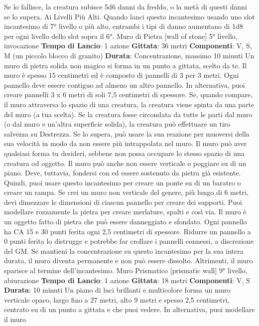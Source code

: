 \begin{multicols}{2}
Se lo fallisce, la creatura subisce 5d6 danni da freddo,
o la metà di questi danni se lo supera.
Ai Livelli Più Alti. Quando lanci questo incantesimo
usando uno slot incantesimo di 7° livello o più alto,
entrambi i tipi di danno aumentano di 1d8 per ogni
livello dello slot sopra il 6°.
Muro di Pietra
[wall of stone]
5° livello, invocazione
\textbf{Tempo di Lancio}: 1 azione
\textbf{Gittata}: 36 metri
\textbf{Componenti}: V, S, M (un piccolo blocco di granito)
\textbf{Durata}: Concentrazione, massimo 10 minuti
Un muro di pietra solida non magico si forma in un
punto a gittata, scelto da te. Il muro è spesso 15
centimetri ed è composto di pannelli di 3 per 3 metri.
Ogni pannello deve essere contiguo ad almeno un altro
pannello. In alternativa, puoi creare pannelli 3 x 6 metri
di soli 7,5 centimetri di spessore.
Se, quando compare, il muro attraversa lo spazio di una
creatura, la creatura viene spinta da una parte del muro
(a tua scelta). Se la creatura fosse circondata da tutte le
parti dal muro (o dal muro e un’altra superficie solida),
la creatura può effettuare un tiro salvezza su Destrezza.
Se lo supera, può usare la sua reazione per muoversi
della sua velocità in modo da non essere più
intrappolata nel muro.
Il muro può aver qualsiasi forma tu desideri, sebbene
non possa occupare lo stesso spazio di una creatura od
oggetto. Il muro può anche non essere verticale o
poggiare su di un piano. Deve, tuttavia, fondersi con ed
essere sostenuto da pietra già esistente. Quindi, puoi
usare questo incantesimo per creare un ponte su di un
baratro o creare un rampa.
Se crei un muro non verticale del genere, più lungo di 6
metri, devi dimezzare le dimensioni di ciascun pannello
per creare dei supporti. Puoi modellare rozzamente la
pietra per creare merlature, spalti e così via.
Il muro è un oggetto fatto di pietra che può essere
danneggiato e sfondato. Ogni pannello ha CA 15 e 30
punti ferita ogni 2,5 centimetri di spessore. Ridurre un
pannello a 0 punti ferita lo distrugge e potrebbe far
crollare i pannelli connessi, a discrezione del GM.
Se mantieni la concentrazione su questo incantesimo
per la sua intera durata, il muro diventa permanente e
non può essere dissolto. Altrimenti, il muro sparisce al
termine dell’incantesimo.
Muro Prismatico
[prismatic wall]
9° livello, abiurazione
\textbf{Tempo di Lancio}: 1 azione
\textbf{Gittata}: 18 metri
\textbf{Componenti}: V, S
\textbf{Durata}: 10 minuti
Un piano di luci brillanti e multicolore forma un muro
verticale opaco, largo fino a 27 metri, alto 9 metri e
spesso 2,5 centimetri, centrato su di un punto a gittata
e che puoi vedere. In alternativa, puoi modellare il muro

\end{multicols}
